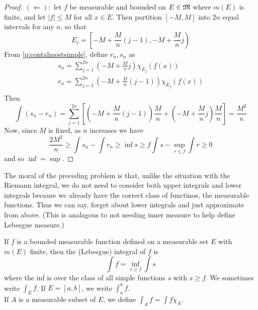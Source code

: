 \begin{pblm}
\begin{proof}
	\noindent $(\Leftarrow): $ let $f$ be measurable and bounded on $E \in \mathfrak{M}$ where 
	$m(E)$ is finite, and let $|f| \le M$ for all $x \in E$. Then partition 
	$[-M, M]$ into $2n$ equal intervals for any $n$, so that 
	\begin{equation*}
		E_j = \left[\left.-M + \frac{M}{n}(j-1), -M + \frac{M}{n}j\right.\right)
	\end{equation*}
	From \ref{p:contalmostsimple}, define $r_n, s_n$ as 
	\begin{equation*}
	\begin{array}{c}
		s_n = \sum\limits_{j=1}^{2n} (-M + \frac{M}{n}j) \chi_{E_j}(f(x)) \\
		r_n = \sum\limits_{j=1}^{2n} (-M + \frac{M}{n}(j-1)) \chi_{E_j}(f(x)) \\
	\end{array}
	\end{equation*}
	Then 
	\begin{equation*}
		\int(s_n-r_n) = \sum\limits_{j=1}^{2n}\left[\left(-M+\frac{M}{n}(j-1)\right)\frac{M}{n} + 
				\left(-M + \frac{M}{n}j\right)\frac{M}{n}\right] 
				= \frac{M^2}{n}
	\end{equation*}
	Now, since $M$ is fixed, as $n$ increases we have 
	\begin{equation*}
		\frac{2M^2}{n} \ge \int s_n - \int r_n \ge \inf\limits{s\ge f}\int s - \sup\limits_{r\le f}\int r \ge 0
	\end{equation*}
	and so $\inf = \sup$. 
\end{proof}
\end{pblm}

\begin{rmk} %
	The moral of the preceding problem is that, unlike the situation with the Riemann 
	integral, we do not need to consider both upper integrals and lower integrals because 
	we already have the correct class of functinos, the measurable functions. Thus we can 
	say, forget about lower integrals and just approximate from above. (This is analagous 
	to not needing inner measure to help define Lebesgue measure.)
\end{rmk}

\begin{defn}\label{d:lebesgueintegral}%
	If $f$ is a bounded measurable function defined on a measurable set $E$ with $m(E)$ 
	finite, then the (Lebesgue) integral of $f$ is 
	\begin{equation*}
		\int f = \inf\limits_{s \ge f}\int s
	\end{equation*}
	where the inf is over the class of all simple functions $s$ with $s \ge f$. We sometimes 
	write $\int_E f$. If $E = [a, b]$, we write $\int_a^b f$.\\ 
	If $A$ is a measurable subset of $E$, we define $\int_A f = \int f\chi_A$. 
\end{defn}

